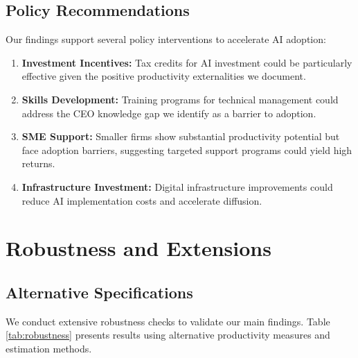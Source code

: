 \documentclass[12pt]{article}
\begin{document}
\subsection{Policy Recommendations}

Our findings support several policy interventions to accelerate AI adoption:

\begin{enumerate}
\item \textbf{Investment Incentives:} Tax credits for AI investment could be particularly effective given the positive productivity externalities we document.

\item \textbf{Skills Development:} Training programs for technical management could address the CEO knowledge gap we identify as a barrier to adoption.

\item \textbf{SME Support:} Smaller firms show substantial productivity potential but face adoption barriers, suggesting targeted support programs could yield high returns.

\item \textbf{Infrastructure Investment:} Digital infrastructure improvements could reduce AI implementation costs and accelerate diffusion.
\end{enumerate}

\section{Robustness and Extensions}

\subsection{Alternative Specifications}

We conduct extensive robustness checks to validate our main findings. Table \ref{tab:robustness} presents results using alternative productivity measures and estimation methods.
\end{document}
